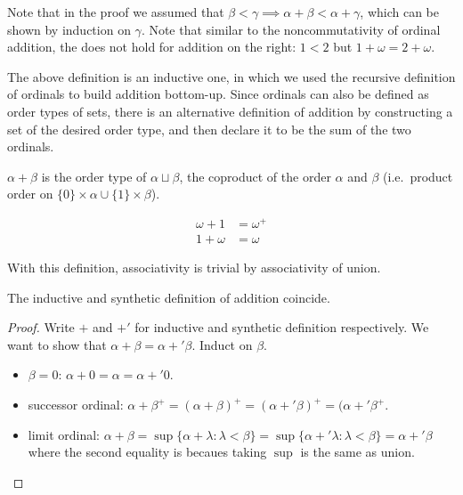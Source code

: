 \documentclass[a4paper]{article}
\begin{document}
Note that in the proof we assumed that \(\beta < \gamma \implies \alpha + \beta < \alpha + \gamma\), which can be shown by induction on \(\gamma\). Note that similar to the noncommutativity of ordinal addition, the does not hold for addition on the right: \(1 < 2\) but \(1 + \omega = 2 + \omega\).

The above definition is an inductive one, in which we used the recursive definition of ordinals to build addition bottom-up. Since ordinals can also be defined as order types of sets, there is an alternative definition of addition by constructing a set of the desired order type, and then declare it to be the sum of the two ordinals.

\begin{definition}
  \(\alpha + \beta\) is the order type of \(\alpha \sqcup \beta\), the coproduct of the order \(\alpha\) and \(\beta\) (i.e.\ product order on \(\{0\} \times \alpha \cup \{1\} \times \beta\)).
\end{definition}

\begin{eg}
  \begin{align*}
    \omega + 1 &= \omega^+ \\
    1 + \omega &= \omega
  \end{align*}
\end{eg}

With this definition, associativity is trivial by associativity of union.

\begin{proposition}
  The inductive and synthetic definition of addition coincide.
\end{proposition}

\begin{proof}
  Write \(+\) and \(+'\) for inductive and synthetic definition respectively. We want to show that \(\alpha + \beta = \alpha +' \beta\). Induct on \(\beta\).
  \begin{itemize}
  \item \(\beta = 0\): \(\alpha + 0 = \alpha = \alpha +' 0\).
  \item successor ordinal: \(\alpha + \beta^+ = (\alpha + \beta)^+ = (\alpha +' \beta)^+ = (\alpha +' \beta^+\).
  \item limit ordinal: \(\alpha + \beta = \sup \{\alpha + \lambda: \lambda < \beta\} = \sup \{\alpha +' \lambda: \lambda < \beta\} = \alpha +' \beta\) where the second equality is becaues taking \(\sup\) is the same as union.
  \end{itemize}
\end{proof}
\end{document}
